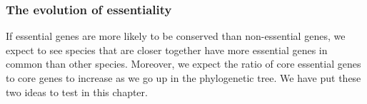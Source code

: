 \documentclass[12pt,letterpaper]{article}
\begin{document}
\subsubsection{The evolution of essentiality}
%
If essential genes are more likely to be conserved than non-essential genes, we expect to see species that are closer together have more essential genes in common than other species. Moreover, we expect the ratio of core essential genes to core genes to increase as we go up in the phylogenetic tree. We have put these two ideas to test in this chapter.
\end{document}
